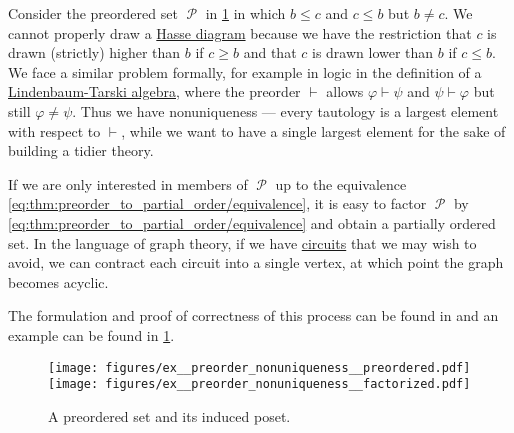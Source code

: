 \begin{example}\label{ex:preorder_nonuniqueness}
  Consider the preordered set \( \mscrP \) in \ref{fig:ex:preorder_nonuniqueness} in which \( b \leq c \) and \( c \leq b \) but \( b \neq c \). We cannot properly draw a \hyperref[def:hasse_diagram]{Hasse diagram} because we have the restriction that \( c \) is drawn (strictly) higher than \( b \) if \( c \geq b \) and that \( c \) is drawn lower than \( b \) if \( c \leq b \). We face a similar problem formally, for example in logic in the definition of a \hyperref[def:lindenbaum_tarski_algebra]{Lindenbaum-Tarski algebra}, where the preorder \( \vdash \) allows \( \varphi \vdash \psi \) and \( \psi \vdash \varphi \) but still \( \varphi \neq \psi \). Thus we have nonuniqueness --- every tautology is a largest element with respect to \( \vdash \), while we want to have a single largest element for the sake of building a tidier theory.

  If we are only interested in members of \( \mscrP \) up to the equivalence \eqref{eq:thm:preorder_to_partial_order/equivalence}, it is easy to factor \( \mscrP \) by \eqref{eq:thm:preorder_to_partial_order/equivalence} and obtain a partially ordered set. In the language of graph theory, if we have \hyperref[def:graph_paths/directed_path]{circuits} that we may wish to avoid, we can contract each circuit into a single vertex, at which point the graph becomes acyclic.

  The formulation and proof of correctness of this process can be found in  and an example can be found in \cref{fig:ex:preorder_nonuniqueness}.

  \begin{figure}
    \hfill
    \texttt{[image: figures/ex\_\_preorder\_nonuniqueness\_\_preordered.pdf]}
    \hfill
    \texttt{[image: figures/ex\_\_preorder\_nonuniqueness\_\_factorized.pdf]}
    \hfill
    \hfill
    \caption{A preordered set and its induced poset.}
    \label{fig:ex:preorder_nonuniqueness}
  \end{figure}
\end{example}

